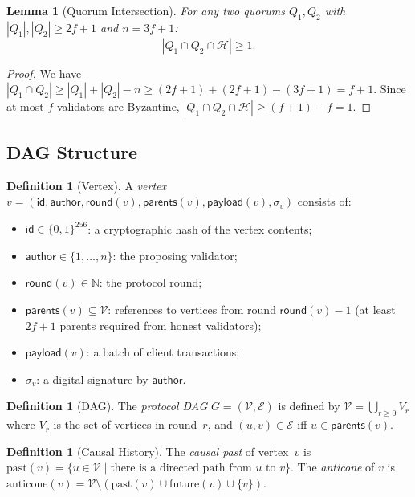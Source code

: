 \documentclass[11pt,a4paper]{article}
\newtheorem{lemma}[theorem]{Lemma}
\theoremstyle{definition}
\newtheorem{definition}[theorem]{Definition}
\theoremstyle{remark}
\newcommand{\anticone}{\mathrm{anticone}}
\newcommand{\past}{\mathrm{past}}
\newcommand{\future}{\mathrm{future}}
\newcommand{\honest}{\mathcal{H}}
\newcommand{\vertices}{\mathcal{V}}
\newcommand{\edges}{\mathcal{E}}
\newcommand{\round}{\mathsf{round}}
\begin{document}
\begin{lemma}[Quorum Intersection]\label{lem:quorum-intersection}
For any two quorums $Q_1, Q_2$ with $|Q_1|, |Q_2| \geq 2f+1$ and
$n = 3f+1$:
\[
  |Q_1 \cap Q_2 \cap \honest| \geq 1.
\]
\end{lemma}

\begin{proof}
We have $|Q_1 \cap Q_2| \geq |Q_1| + |Q_2| - n \geq (2f+1) + (2f+1) -
(3f+1) = f+1$.
Since at most $f$ validators are Byzantine,
$|Q_1 \cap Q_2 \cap \honest| \geq (f+1) - f = 1$.
\end{proof}

\subsection{DAG Structure}

\begin{definition}[Vertex]\label{def:vertex}
A \emph{vertex} $v = (\mathsf{id}, \mathsf{author}, \round(v),
\mathsf{parents}(v), \mathsf{payload}(v), \sigma_v)$ consists of:
\begin{itemize}[nosep]
  \item $\mathsf{id} \in \{0,1\}^{256}$: a cryptographic hash of the
    vertex contents;
  \item $\mathsf{author} \in \{1, \ldots, n\}$: the proposing validator;
  \item $\round(v) \in \mathbb{N}$: the protocol round;
  \item $\mathsf{parents}(v) \subseteq \vertices$: references to
    vertices from round $\round(v) - 1$ (at least $2f+1$ parents
    required from honest validators);
  \item $\mathsf{payload}(v)$: a batch of client transactions;
  \item $\sigma_v$: a digital signature by $\mathsf{author}$.
\end{itemize}
\end{definition}

\begin{definition}[DAG]\label{def:dag}
The \emph{protocol DAG} $G = (\vertices, \edges)$ is defined by
$\vertices = \bigcup_{r \geq 0} V_r$ where $V_r$ is the set of vertices
in round~$r$, and $(u, v) \in \edges$ iff $u \in \mathsf{parents}(v)$.
\end{definition}

\begin{definition}[Causal History]\label{def:causal-past}
The \emph{causal past} of vertex~$v$ is
$\past(v) = \{u \in \vertices \mid \text{there is a directed path from } u \text{ to } v\}$.
The \emph{anticone} of $v$ is
$\anticone(v) = \vertices \setminus (\past(v) \cup \future(v) \cup \{v\})$.
\end{definition}
\end{document}
